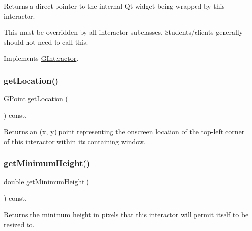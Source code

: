 Returns a direct pointer to the internal Qt widget being wrapped by this interactor. 

This must be overridden by all interactor subclasses. Students/clients generally should not need to call this. 

Implements \mbox{\hyperlink{classGInteractor}{G\+Interactor}}.

\mbox{\label{classGInteractor_a4f83802015511edeb63b892830812c11}} 
\subsubsection{\texorpdfstring{get\+Location()}{getLocation()}}
{\footnotesize\ttfamily \mbox{\hyperlink{structGPoint}{G\+Point}} get\+Location (\begin{DoxyParamCaption}{ }\end{DoxyParamCaption}) const\hspace{0.3cm}{\ttfamily [virtual]}, {\ttfamily [inherited]}}



Returns an (x, y) point representing the onscreen location of the top-\/left corner of this interactor within its containing window. 

\mbox{\label{classGInteractor_aed4b0075fcc434499c3cb3e46896bda3}} 
\subsubsection{\texorpdfstring{get\+Minimum\+Height()}{getMinimumHeight()}}
{\footnotesize\ttfamily double get\+Minimum\+Height (\begin{DoxyParamCaption}{ }\end{DoxyParamCaption}) const\hspace{0.3cm}{\ttfamily [virtual]}, {\ttfamily [inherited]}}



Returns the minimum height in pixels that this interactor will permit itself to be resized to. 

\mbox{\label{classGInteractor_a66b5af0b32493b4d597ca0a3df2049ea}} 

